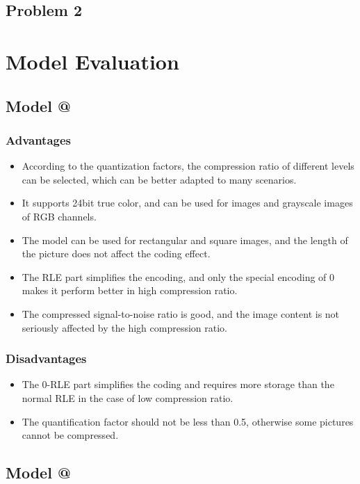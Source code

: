 \documentclass{mcmthesis}
\makeatletter
\newcommand{\Rmnum}[1]{\expandafter\@slowromancap\romannumeral #1@}
\makeatother
\begin{document}
\subsection{Problem 2}

\section{Model Evaluation}
\subsection{Model \Rmnum{1}}
\subsubsection{Advantages}
\begin{itemize}
  \item According to the quantization factors, the compression ratio of different levels can be selected, which can be better adapted to many scenarios.
  \item It supports 24bit true color, and can be used for images and grayscale images of RGB channels.
  \item The model can be used for rectangular and square images, and the length of the picture does not affect the coding effect.
  \item The RLE part simplifies the encoding, and only the special encoding of 0 makes it perform better in high compression ratio.
  \item The compressed signal-to-noise ratio is good, and the image content is not seriously affected by the high compression ratio.
\end{itemize}

\subsubsection{Disadvantages}
\begin{itemize}
  \item The 0-RLE part simplifies the coding and requires more storage than the normal RLE in the case of low compression ratio.
  \item The quantification factor should not be less than 0.5, otherwise some pictures cannot be compressed.
\end{itemize}

\subsection{Model \Rmnum{2}}
\end{document}
